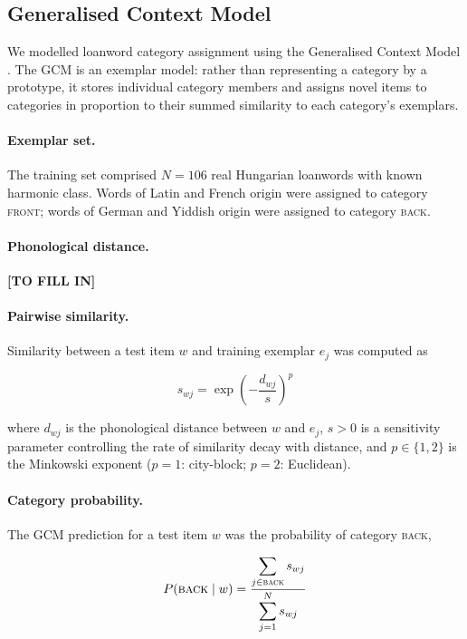 \subsection{Generalised Context Model}

We modelled loanword category assignment using the Generalised Context Model \citep[GCM;][]{nosofsky1988}. The GCM is an exemplar model: rather than representing a category by a prototype, it stores individual category members and assigns novel items to categories in proportion to their summed similarity to each category's exemplars.

\paragraph{Exemplar set.}
The training set comprised \(N = 106\) real Hungarian loanwords with known harmonic class. Words of Latin and French origin were assigned to category \textsc{front}; words of German and Yiddish origin were assigned to category \textsc{back}.

\paragraph{Phonological distance.}
\textbf{[TO FILL IN]}

\paragraph{Pairwise similarity.}
Similarity between a test item \(w\) and training exemplar \(e_j\) was computed as

\begin{equation}
  s_{wj} = \exp\!\left(-\frac{d_{wj}}{s}\right)^{\!p}
  \label{eq:gcm-sim}
\end{equation}

\noindent where \(d_{wj}\) is the phonological distance between \(w\) and \(e_j\), \(s > 0\) is a sensitivity parameter controlling the rate of similarity decay with distance, and \(p \in \{1, 2\}\) is the Minkowski exponent (\(p = 1\): city-block; \(p = 2\): Euclidean).

\paragraph{Category probability.}
The GCM prediction for a test item \(w\) was the probability of category \textsc{back},

\begin{equation}
  P(\textsc{back} \mid w) = \frac{\displaystyle\sum_{j \in \textsc{back}} s_{wj}}{\displaystyle\sum_{j=1}^{N} s_{wj}}
  \label{eq:gcm-prob}
\end{equation}

